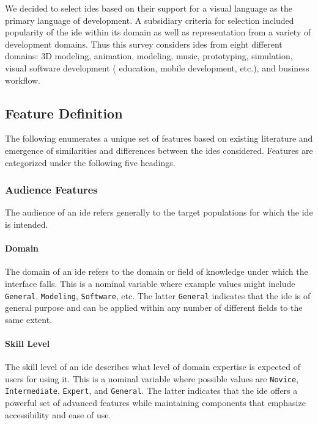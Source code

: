 We decided to select \acp{ide} based on their support for a visual language
as the primary language of development. A subsidiary criteria for selection
included popularity of the \ac{ide} within its domain as well as
representation from a variety of development domains. Thus this survey
considers \acp{ide} from eight different domains: 3D modeling, animation,
modeling, music, prototyping, simulation, visual software development (\eg
education, mobile development, etc.), and business workflow.


\subsection{Feature Definition} \label{subsec:featuredefinition}

The following enumerates a unique set of features based on existing
literature and emergence of similarities and differences between the
\acp{ide} considered. Features are categorized under the following five
headings.


\subsubsection{Audience Features} \label{subsubsec:audience}

The audience of an \ac{ide} refers generally to the target populations for
which the \ac{ide} is intended.


\paragraph{Domain}
The domain of an \ac{ide} refers to the domain or field of knowledge under
which the interface falls.
This is a nominal variable where example values might include
\texttt{General}, \texttt{Modeling}, \texttt{Software}, etc. The latter
\texttt{General} indicates that the \ac{ide} is of general purpose and can
be applied within any number of different fields to the same extent.


\paragraph{Skill Level}
The skill level of an \ac{ide} describes what level of domain expertise is
expected of users for using it. This is a nominal variable where possible
values are \texttt{Novice}, \texttt{Intermediate}, \texttt{Expert}, and
\texttt{General}. The latter indicates that the \ac{ide} offers a powerful
set of advanced features while maintaining components that emphasize
accessibility and ease of use.


